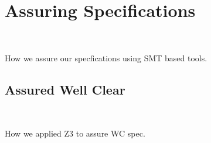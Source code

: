 \section{Assuring Specifications}~\label{sec:specverify}

How we assure our specfications using SMT based tools\citep{assuring-guardians}.


\subsection{Assured Well Clear}~\label{sec:verifiywc} 

How we applied Z3 to assure WC spec.


